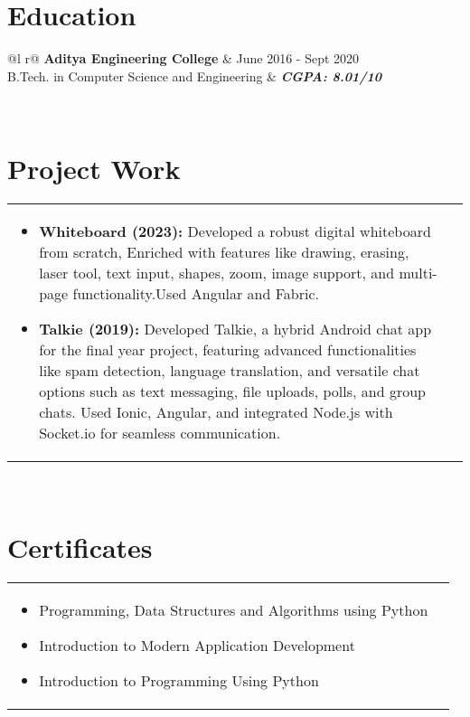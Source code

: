 \documentclass[a4paper,8pt]{article}
\begin{document}
\section{Education}
\begin{tabularx}{\linewidth}{ @{}l r@{} }
\color[HTML]{1C033C} \textbf{Aditya Engineering College} & \hfill \color[HTML]{371e77} June 2016 - Sept 2020 \\
\color[HTML]{371e77} B.Tech. in Computer Science and Engineering & \hfill \color[HTML]{4B28A4} \textit{\textbf{CGPA: 8.01/10}} \\
\end{tabularx}\\[3pt]

\section{Project Work}
\begin{tabularx}{\linewidth}{ @{}l r@{} }
\begin{minipage}[t]{\linewidth}
    \begin{itemize}[nosep,after=\strut, leftmargin=2em, itemsep=2pt]
        \item \textbf{Whiteboard (2023):} Developed a robust digital whiteboard from scratch, Enriched with features like drawing, erasing, laser tool, text input, shapes, zoom, image support, and multi-page functionality.Used Angular and Fabric.
        \item \textbf{Talkie (2019):} Developed Talkie, a hybrid Android chat app for the final year project, featuring advanced functionalities like spam detection, language translation, and versatile chat options such as text messaging, file uploads, polls, and group chats. Used Ionic, Angular, and integrated Node.js with Socket.io for seamless communication.
    \end{itemize}
    \end{minipage}
\end{tabularx}\\[3pt]

\section{Certificates}
\begin{tabularx}{\linewidth}{ @{}l r@{} }
\begin{minipage}[t]{\linewidth}
    \begin{itemize}[nosep,after=\strut, leftmargin=2em, itemsep=2pt]
        \item Programming, Data Structures and Algorithms using Python
        \item Introduction to Modern Application Development
        \item Introduction to Programming Using Python
    \end{itemize}
\end{minipage}
\end{tabularx}
\end{document}
